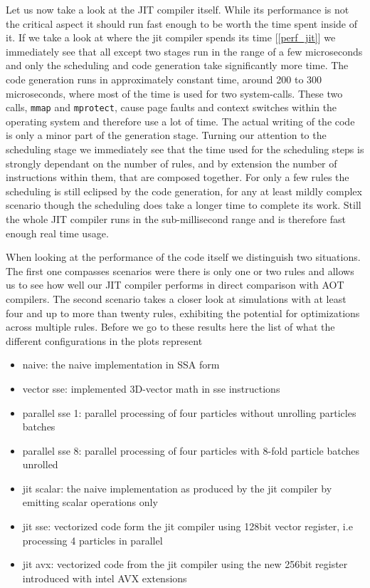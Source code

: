 Let us now take a look at the JIT compiler itself. While its performance is not the critical aspect it should run fast enough to be worth the time spent inside of it.
If we take a look at where the jit compiler spends its time [\ref{perf_jit}] we immediately see that all except two stages run in the range of a few microseconds and only the scheduling and code generation take significantly more time. The code generation runs in approximately constant time, around 200 to 300 microseconds, where most of the time is used for two system-calls. These two calls, \texttt{mmap} and \texttt{mprotect}, cause page faults and context switches within the operating system and therefore use a lot of time. The actual writing of the code is only a minor part of the generation stage. Turning our attention to the scheduling stage we immediately see that the time used for the scheduling steps is strongly dependant on the number of rules, and by extension the number of instructions within them, that are composed together. For only a few rules the scheduling is still eclipsed by the code generation, for any at least mildly complex scenario though the scheduling does take a longer time to complete its work. Still the whole JIT compiler runs in the sub-millisecond range and is therefore fast enough real time usage.


When looking at the performance of the code itself we distinguish two situations. The first one compasses scenarios were there is only one or two rules and allows us to see how well our JIT compiler performs in direct comparison with AOT compilers. The second scenario takes a closer look at simulations with at least four and up to more than twenty rules, exhibiting the potential for optimizations across multiple rules. Before we go to these results here the list of what the different configurations in the plots represent
\begin{itemize}
\item naive: the naive implementation in SSA form
\item vector sse: implemented 3D-vector math in sse instructions
\item parallel sse 1: parallel processing of four particles without unrolling particles batches
\item parallel sse 8: parallel processing of four particles with 8-fold particle batches unrolled
\item jit scalar: the naive implementation as produced by the jit compiler by emitting scalar operations only
\item jit sse: vectorized code form the jit compiler using 128bit vector register, i.e processing 4 particles in parallel
\item jit avx: vectorized code from the jit compiler using the new 256bit register introduced with intel AVX extensions 
\end{itemize} 

